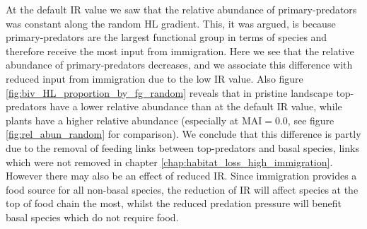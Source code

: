 At the default IR value we saw that the relative abundance of primary-predators was constant along the random HL gradient. This, it was argued, is because primary-predators are the largest functional group in terms of species and therefore receive the most input from immigration. Here we see that the relative abundance of primary-predators decreases, and we associate this difference with reduced input from immigration due to the low IR value. Also figure \ref{fig:biv_HL_proportion_by_fg_random} reveals that in pristine landscape top-predators have a lower relative abundance than at the default IR value, while plants have a higher relative abundance (especially at MAI$=0.0$, see figure \ref{fig:rel_abun_random} for comparison). We conclude that this difference is partly due to the removal of feeding links between top-predators and basal species, links which were not removed in chapter \ref{chap:habitat_loss_high_immigration}. However there may also be an effect of reduced IR. Since immigration provides a food source for all non-basal species, the reduction of IR will affect species at the top of food chain the most, whilst the reduced predation pressure will benefit basal species which do not require food.
%

